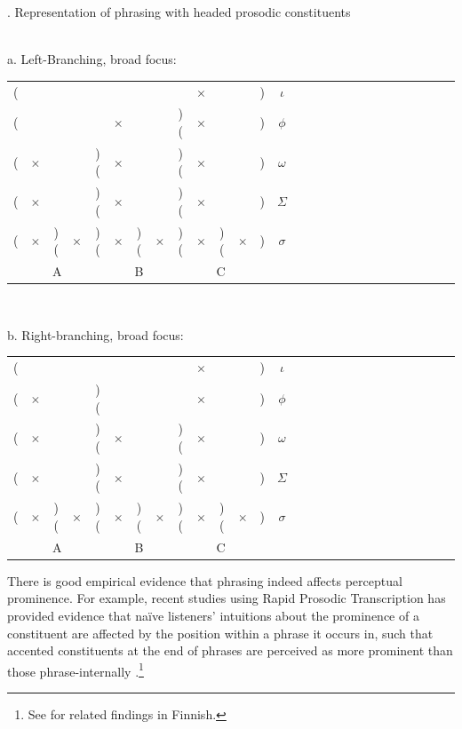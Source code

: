 \documentclass[preprint,review,12pt,authoryear,times]{elsarticle}
\newcommand{\g}{$\times$}
\begin{document}
\ex. Representation of phrasing with headed prosodic constituents\\\label{phrasingrep}
\vspace{-10pt}
\ \\
\parbox{2in}{\footnotesize a. Left-Branching, broad focus:\\
\vspace{-12pt}
\setlength{\unitlength}{1cm}
\setlength\extrarowheight{-3pt}
\begin{tabular}{ccccccccccccccccccccccccccc}
(&&&&&&&&&\g&&&)&\em $\iota$\\
(&&&&&\g&&&)(&\g&&&)&$\phi$\\
(&\g&&&)(&\g&&&)(&\g&&&)&$\omega$\\
(&\g&&&)(&\g&&&)(&\g&&&)&$\Sigma$\\
(&\g&)(&\g&)(&\g&)(&\g&)(&\g&)(&\g&)&$\sigma$\\
\multicolumn{5}{c}{A}&\multicolumn{3}{c}{B}&\multicolumn{5}{c}{C}\\
\end{tabular}
 }
 \vspace{10pt}
  \ \\
\parbox{2in}{\footnotesize b. Right-branching, broad focus:\\
\vspace{-12pt}
\setlength{\unitlength}{1cm}
\setlength\extrarowheight{-3pt}
\begin{tabular}{ccccccccccccccccccccccccccc}
(&&&&&&&&&\g&&&)&\em $\iota$\\
(&\g&&&)(&&&&&\g&&&)&$\phi$\\
(&\g&&&)(&\g&&&)(&\g&&&)&$\omega$\\
(&\g&&&)(&\g&&&)(&\g&&&)&$\Sigma$\\
(&\g&)(&\g&)(&\g&)(&\g&)(&\g&)(&\g&)&$\sigma$\\
\multicolumn{5}{c}{A}&\multicolumn{3}{c}{B}&\multicolumn{5}{c}{C}\\
\end{tabular}
}\label{ferywide}

There is good empirical evidence that phrasing indeed affects perceptual prominence. For example, recent studies using Rapid Prosodic Transcription \citep{cole10rapid} has provided evidence that na\"ive listeners' intuitions about the prominence of a constituent are affected by the position within a phrase it occurs in, such that accented constituents at the end of phrases are perceived as more prominent than those phrase-internally \citep[see also][]{bisho19,cole19}.\footnote{See \citet{vaini06} for related findings in Finnish.}  
\end{document}
